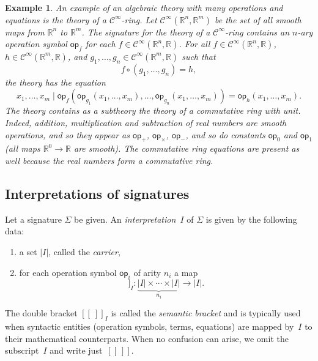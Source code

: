 \documentclass{amsart}
\newcommand{\RR}{\mathbb{R}}
\newcommand{\op}{\mathsf{op}}
\newcommand{\Cinfty}{\mathcal{C}^\infty}
\newcommand{\sem}[1]{[\![#1]\!]}
\newtheorem{example}[definition]{Example}
\begin{document}
\begin{example}
  \label{ex:Cinfty-theory}
  An example of an algebraic theory with many operations and equations is the theory of a
  $\Cinfty$-ring. Let $\Cinfty(\RR^n, \RR^m)$ be the set of all smooth maps from $\RR^n$
  to $\RR^m$. The signature for the theory of a $\Cinfty$-ring contains an $n$-ary
  operation symbol $\op_f$ for each $f \in \Cinfty(\RR^n, \RR)$. For all
  $f \in \Cinfty(\RR^n, \RR)$, $h \in \Cinfty(\RR^m, \RR)$, and
  $g_1, \ldots, g_n \in \Cinfty(\RR^m, \RR)$ such that
  \begin{equation*}
    f \circ (g_1, \ldots, g_n) = h,
  \end{equation*}
  the theory has the equation
  \begin{equation*}
    x_1, \ldots, x_m \mid
    \op_f (\op_{g_1}(x_1, \ldots, x_m), \ldots, \op_{g_n}(x_1, \ldots, x_m)) =
    \op_h(x_1, \ldots, x_m).
  \end{equation*}
  The theory contains as a subtheory the theory of a commutative ring with unit. Indeed,
  addition, multiplication and subtraction of real numbers are smooth operations, and so
  they appear as $\op_{+}$, $\op_{\times}$, $\op_{-}$, and so do constants $\op_0$ and
  $\op_1$ (all maps $\RR^0 \to \RR$ are smooth). The commutative ring equations are
  present as well because the real numbers form a commutative ring.
\end{example}


\subsection{Interpretations of signatures}
\label{sec:interp-of-sign}

Let a signature $\Sigma$ be given. An \emph{interpretation~$I$} of $\Sigma$ is given by
the following data:
%
\begin{enumerate}
\item a set $|I|$, called the \emph{carrier},
\item for each operation symbol $\op_i$ of arity $n_i$ a map
  \begin{equation*}
    \sem{\op_i}_I : \underbrace{|I| \times \cdots \times |I|}_{n_i} \to |I|.
  \end{equation*}
\end{enumerate}
%
The double bracket $\sem{{\ }}_I$ is called the \emph{semantic bracket} and is typically
used when syntactic entities (operation symbols, terms, equations) are mapped by~$I$ to
their mathematical counterparts. When no confusion can arise, we omit the subscript~$I$
and write just~$\sem{{\ }}$.
\end{document}
